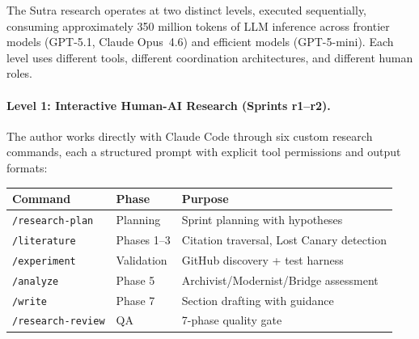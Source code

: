 \documentclass{article}
\begin{document}
%
%
%

The Sutra research operates at two distinct levels, executed sequentially, consuming
approximately 350 million tokens of LLM inference across frontier models (GPT-5.1,
Claude Opus~4.6) and efficient models (GPT-5-mini). Each level uses different tools,
different coordination architectures, and different human roles.

\paragraph{Level 1: Interactive Human-AI Research (Sprints r1--r2).}
The author works directly with Claude Code through six custom research commands, each
a structured prompt with explicit tool permissions and output formats:

\begin{center}
\small
\begin{tabular}{@{} l l p{3.2cm} @{}}
\toprule
\textbf{Command} & \textbf{Phase} & \textbf{Purpose} \\
\midrule
\texttt{/research-plan} & Planning & Sprint planning with hypotheses \\
\texttt{/literature} & Phases 1--3 & Citation traversal, Lost Canary detection \\
\texttt{/experiment} & Validation & GitHub discovery + test harness \\
\texttt{/analyze} & Phase 5 & Archivist/Modernist/Bridge assessment \\
\texttt{/write} & Phase 7 & Section drafting with guidance \\
\texttt{/research-review} & QA & 7-phase quality gate \\
\bottomrule
\end{tabular}
\end{center}
\end{document}
